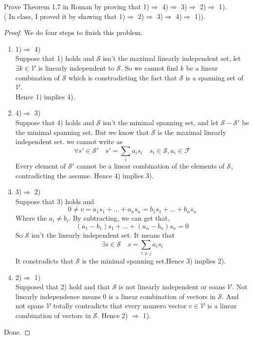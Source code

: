 \documentclass[a4paper]{article}
\begin{document}
\begin{description}
{       Prove Theorem 1.7 in Roman by proving that 1)$\Rightarrow$ 4)$\Rightarrow$  3)$\Rightarrow$  2)$\Rightarrow$  1).\\
       ( In class, I proved it by showing that 1)$\Rightarrow$  2)$\Rightarrow$  3)$\Rightarrow$  4)$\Rightarrow$  1)).
 }
 \begin{proof}
  We do four steps to finish this problem.
  \begin{enumerate}
   \item 1)$\Rightarrow $ 4)\\
         Suppose that 1) holds and $\mathcal{S}$ isn't the maximal linearly independent set,
         let $\exists k \in \mathcal{V}$ is linearly independent to $\mathcal{S}$.
         So we cannot find $k$ be a linear combination of $\mathcal{S}$ which is constradicting the fact that $\mathcal{S}$
         is a spanning set of $\mathcal{V}$.\\
         Hence 1) implies 4).
   \item 4)$\Rightarrow$ 3)\\
         Suppose that 4) holds and $\mathcal{S}$ isn't the minimal spanning set, and let $\mathcal{S}-\mathcal{S}'$ be
         the minimal spanning set. But we know that $\mathcal{S}$ is the maximal linearly independent set.
         we cannot write as $$\forall s' \in \mathcal{S}'\quad s'=\sum_{i} a_{i}s_{i} \quad s_{i} \in \mathcal{S},a_{i} \in \mathcal{F}$$
         Every element of $\mathcal{S}'$ cannot be a linear combination of the elements of $\mathcal{S}$,
         contradicting the assume. Hence 4) implies 3).
   \item 3)$\Rightarrow$ 2)\\
         Suppose that 3) holds and
         \begin{equation*}
          0\ne v=a_{1}s_{1}+...+a_{n}s_{n}=b_{1}s_{1}+...+b_{n}s_{n}
         \end{equation*}
         Where the $a_{i}\ne b_{i}$. By subtracting, we can get that,
         \begin{equation*}
          (a_{1}-b_{1})s_{1}+...+(a_{n}-b_{n})s_{n}=0
         \end{equation*}
         So $\mathcal{S}$ isn't the linearly independent set. It means that
         $$\exists s \in \mathcal{S} \quad s=\sum_{i\ne j} a_{i}s_{i}$$
         It constradicts that $\mathcal{S}$ is the minimal spanning set.Hence 3) implies 2).
   \item 2)$\Rightarrow$ 1)\\
         Supposed that 2) hold and that $\mathcal{S}$ is not linearly independent or soans $\mathcal{V}$.
         Not linearly independence means $0$ is a linear combination of vectors in $\mathcal{S}$.
         And not spans $\mathcal{V}$ totally contradicts that every nonzero vector $v\in \mathcal{V}$ is a linear combination of vectors in $\mathcal{S}$.
         Hence 2) $\Rightarrow$ 1).
  \end{enumerate}
  Done.
 \end{proof}
\end{description}
\end{document}
